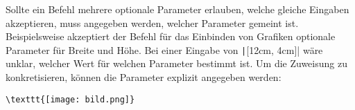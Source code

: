\begin{table}[h!]
	\caption{Beispiele für \LaTeX-Befehle}
	\label{tbl:latex-commands}
\end{table}

Sollte ein Befehl mehrere optionale Parameter erlauben, welche gleiche Eingaben akzeptieren, muss angegeben werden, welcher Parameter gemeint ist. Beispielsweise akzeptiert der Befehl für das Einbinden von Grafiken optionale Parameter für Breite und Höhe. Bei einer Eingabe von \texttt|[12cm, 4cm]| wäre unklar, welcher Wert für welchen Parameter bestimmt ist. Um die Zuweisung zu konkretisieren, können die Parameter explizit angegeben werden:
\begin{verbatim}
\texttt{[image: bild.png]}
\end{verbatim}
